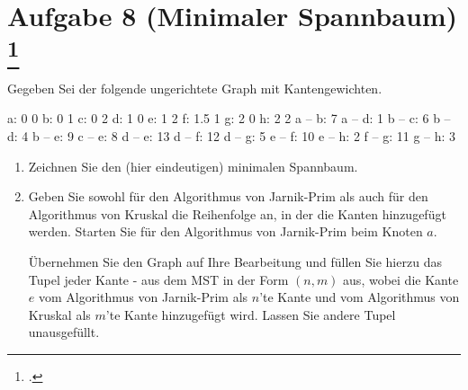 \documentclass{lehramt-informatik-aufgabe}
\begin{document}
\section{Aufgabe 8 (Minimaler Spannbaum)
\footcite{66115:2019:09}}

Gegeben Sei der folgende ungerichtete Graph mit Kantengewichten.

\begin{liGraphenFormat}
a: 0 0
b: 0 1
c: 0 2
d: 1 0
e: 1 2
f: 1.5 1
g: 2 0
h: 2 2
a -- b: 7
a -- d: 1
b -- c: 6
b -- d: 4
b -- e: 9
c -- e: 8
d -- e: 13
d -- f: 12
d -- g: 5
e -- f: 10
e -- h: 2
f -- g: 11
g -- h: 3
\end{liGraphenFormat}

\begin{center}
\end{center}

\begin{enumerate}

\item Zeichnen Sie den (hier eindeutigen) minimalen Spannbaum.


\item Geben Sie sowohl für den Algorithmus von Jarnik-Prim als auch für
den Algorithmus von Kruskal die Reihenfolge an, in der die Kanten
hinzugefügt werden. Starten Sie für den Algorithmus von Jarnik-Prim beim
Knoten $a$.

Übernehmen Sie den Graph auf Ihre Bearbeitung und füllen Sie hierzu das
Tupel jeder Kante - aus dem MST in der Form $(n, m)$ aus, wobei die
Kante $e$ vom Algorithmus von Jarnik-Prim als $n$’te Kante und vom
Algorithmus von Kruskal als $m$’te Kante hinzugefügt wird. Lassen Sie
andere Tupel unausgefüllt.
\end{enumerate}
\end{document}
